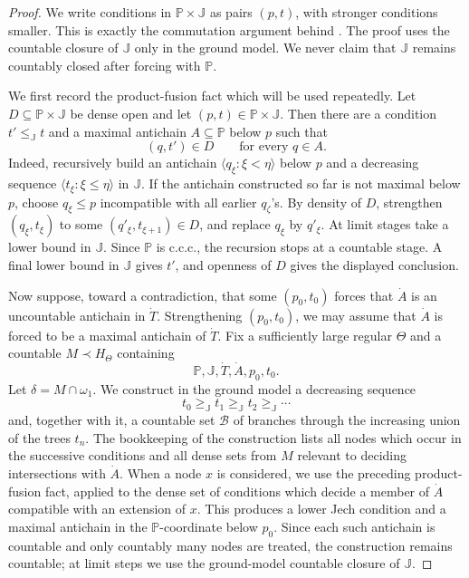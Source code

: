 \documentclass[11pt]{article}
\theoremstyle{plain}
\theoremstyle{definition}
\theoremstyle{remark}
\begin{document}
\begin{proof}
We write conditions in \(\mathbb P\times\mathbb J\) as pairs \((p,t)\), with
stronger conditions smaller.  This is exactly the commutation argument behind
\cite[Claim~2.7]{FISCHER2013763}.  The proof uses the countable closure of
\(\mathbb J\) only in the ground model.  We never claim that \(\mathbb J\)
remains countably closed after forcing with \(\mathbb P\).

We first record the product-fusion fact which will be used repeatedly.  Let
\(D\subseteq\mathbb P\times\mathbb J\) be dense open and let
\((p,t)\in\mathbb P\times\mathbb J\).  Then there are a condition
\(t'\leq_{\mathbb J}t\) and a maximal antichain \(A\subseteq\mathbb P\) below
\(p\) such that
\[
  (q,t')\in D \qquad\text{for every }q\in A.
\]
Indeed, recursively build an antichain \(\langle q_\xi:\xi<\eta\rangle\) below
\(p\) and a decreasing sequence \(\langle t_\xi:\xi\leq\eta\rangle\) in
\(\mathbb J\).  If the antichain constructed so far is not maximal below
\(p\), choose \(q_\xi\leq p\) incompatible with all earlier \(q_\zeta\)'s.  By
density of \(D\), strengthen \((q_\xi,t_\xi)\) to some \((q'_\xi,t_{\xi+1})\in D\),
and replace \(q_\xi\) by \(q'_\xi\).  At limit stages take a lower bound in
\(\mathbb J\).  Since \(\mathbb P\) is c.c.c., the recursion stops at a countable
stage.  A final lower bound in \(\mathbb J\) gives \(t'\), and openness of \(D\)
gives the displayed conclusion.

Now suppose, toward a contradiction, that some \((p_0,t_0)\) forces that
\(\dot A\) is an uncountable antichain in \(\dot T\).  Strengthening
\((p_0,t_0)\), we may assume that \(\dot A\) is forced to be a maximal antichain
of \(\dot T\).  Fix a sufficiently large regular \(\Theta\) and a countable
\(M\prec H_\Theta\) containing
\[
  \mathbb P,\mathbb J,\dot T,\dot A,p_0,t_0.
\]
Let \(\delta=M\cap\omega_1\).  We construct in the ground model a decreasing
sequence
\[
  t_0\geq_{\mathbb J} t_1\geq_{\mathbb J}t_2\geq_{\mathbb J}\cdots
\]
and, together with it, a countable set \(\mathcal B\) of branches through the
increasing union of the trees \(t_n\).  The bookkeeping of the construction
lists all nodes which occur in the successive conditions and all dense sets from
\(M\) relevant to deciding intersections with \(\dot A\).  When a node \(x\) is
considered, we use the preceding product-fusion fact, applied to the dense set
of conditions which decide a member of \(\dot A\) compatible with an extension of
\(x\).  This produces a lower Jech condition and a maximal antichain in the
\(\mathbb P\)-coordinate below \(p_0\).  Since each such antichain is countable
and only countably many nodes are treated, the construction remains countable;
at limit steps we use the ground-model countable closure of \(\mathbb J\).


\end{proof}
\end{document}
